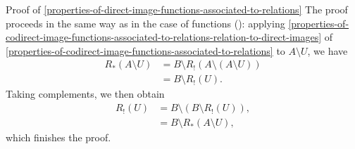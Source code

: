 \begin{Proof}{Proof of \cref{properties-of-direct-image-functions-associated-to-relations}}
    The proof proceeds in the same way as in the case of functions (): applying \cref{properties-of-codirect-image-functions-associated-to-relations-relation-to-direct-images} of \cref{properties-of-codirect-image-functions-associated-to-relations} to $A\setminus U$, we have
    \begin{align*}
        R_{*}(A\setminus U) &= B\setminus R_{!}(A\setminus(A\setminus U))\\
                            &= B\setminus R_{!}(U).
    \end{align*}
    Taking complements, we then obtain
    \begin{align*}
        R_{!}(U) &= B\setminus(B\setminus R_{!}(U)),\\
                 &= B\setminus R_{*}(A\setminus U),
    \end{align*}
    which finishes the proof.
\end{Proof}
